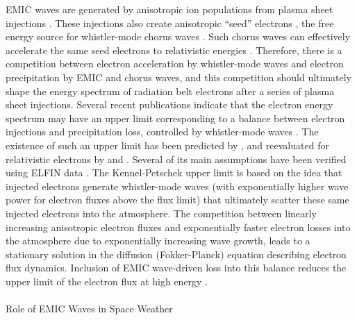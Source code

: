 \documentclass[
  letterpaper,
  DIV=11,
  numbers=noendperiod]{scrartcl}
\makeatletter
\let\oldparagraph\paragraph
\renewcommand{\paragraph}{
    \@ifstar
      \xxxParagraphStar
      \xxxParagraphNoStar
  }
\newcommand{\xxxParagraphStar}[1]{\oldparagraph*{#1}\mbox{}}
\newcommand{\xxxParagraphNoStar}[1]{\oldparagraph{#1}\mbox{}}
\makeatother
\begin{document}
EMIC waves are generated by anisotropic ion populations from plasma sheet injections \citep{Jun19:emic}. These injections also create anisotropic ``seed'' electrons \citep{Miyoshi13,Jaynes15:seedelectrons}, the free energy source for whistler-mode chorus waves \citep{Tao11,Fu14:radiation_belts,Zhang18:whistlers&injections}. Such chorus waves can effectively accelerate the same seed electrons to relativistic energies \citep{miyoshiRebuildingProcessOuter2003, thorneRapidLocalAcceleration2013, mourenasApproximateAnalyticalSolutions2014, allisonLocalHeatingRadiation2020}. Therefore, there is a competition between electron acceleration by whistler-mode waves \citep[supported by direct adiabatic heating during injections, see, e.g.][]{sorathiaModelingDepletionRecovery2018} and electron precipitation by EMIC and chorus waves, and this competition should ultimately shape the energy spectrum of radiation belt electrons after a series of plasma sheet injections. Several recent publications indicate that the electron energy spectrum may have an upper limit corresponding to a balance between electron injections and precipitation loss, controlled by whistler-mode waves \citep{oliferTaleTwoRadiation2021, oliferNaturalLimitSpectral2022}. The existence of such an upper limit has been predicted by \citet{kennelLimitStablyTrapped1966}, and reevaluated for relativistic electrons by \citet{summersLimitStablyTrapped2009} and \citet{summersLimitingEnergySpectrum2014}. Several of its main assumptions have been verified using ELFIN data \citep{mourenasCheckingKeyAssumptions2024}. The Kennel-Petschek upper limit is based on the idea that injected electrons generate whistler-mode waves (with exponentially higher wave power for electron fluxes above the flux limit) that ultimately scatter these same injected electrons into the atmosphere. The competition between linearly increasing anisotropic electron fluxes and exponentially faster electron losses into the atmosphere due to exponentially increasing wave growth, leads to a stationary solution in the diffusion (Fokker-Planck) equation describing electron flux dynamics. Inclusion of EMIC wave-driven loss into this balance reduces the upper limit of the electron flux at high energy \citep{mourenasExtremeEnergySpectra2022}.

\paragraph{Role of EMIC Waves in Space Weather}\label{role-of-emic-waves-in-space-weather}
\end{document}
